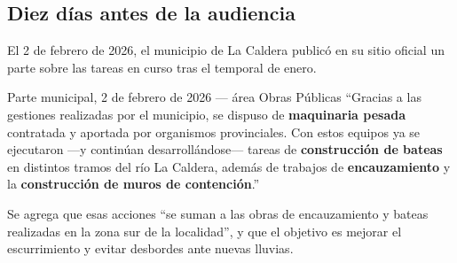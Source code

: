 \subsection*{Diez días antes de la audiencia}

El 2 de febrero de 2026, el municipio de La Caldera publicó en su sitio oficial un parte sobre las tareas en curso tras el temporal de enero.

\begin{ficha}{Parte municipal, 2 de febrero de 2026 --- área Obras Públicas}
``Gracias a las gestiones realizadas por el municipio, se dispuso de \textbf{maquinaria pesada} contratada y aportada por organismos provinciales. Con estos equipos ya se ejecutaron ---y continúan desarrollándose--- tareas de \textbf{construcción de bateas} en distintos tramos del río La Caldera, además de trabajos de \textbf{encauzamiento} y la \textbf{construcción de muros de contención}.''

Se agrega que esas acciones ``se suman a las obras de encauzamiento y bateas realizadas en la zona sur de la localidad'', y que el objetivo es mejorar el escurrimiento y evitar desbordes ante nuevas lluvias.
\end{ficha}

